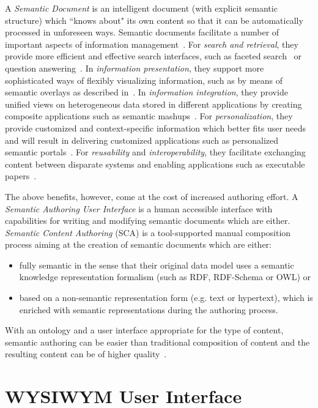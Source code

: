 \documentclass[journal]{IEEEtran}
\begin{document}
A \emph{Semantic Document} is an intelligent document (with explicit semantic structure) which ``knows about" its own content so that it can be automatically processed in unforeseen ways.
Semantic documents facilitate a number of important aspects of information management~\cite{rdface}.
For \emph{search and retrieval}, they provide more efficient and effective search interfaces, such as faceted search~\cite{tunkenlang2009faceted} or question answering~\cite{Lopez2011}.
In \emph{information presentation}, they support more sophisticated ways of flexibly visualizing information, such as by means of semantic overlays as described in~\cite{Burel2009}.
In \emph{information integration}, they provide unified views on heterogeneous data stored in different applications by creating composite applications such as semantic mashups~\cite{Ankolekar2007}.
For \emph{personalization}, they provide customized and context-specific information which better fits user needs and will
result in delivering customized applications such as personalized semantic portals~\cite{ecs2007}.
For \emph{reusability} and \emph{interoperability}, they facilitate exchanging content between disparate systems and enabling applications such as executable papers~\cite{Muller2011}.


The above benefits, however, come at the cost of increased authoring effort. %
A \emph{Semantic Authoring User Interface} is a human accessible interface with capabilities for writing and modifying semantic documents which are either.
\emph{Semantic Content Authoring} (SCA) is a tool-supported manual composition process aiming at the creation of semantic documents which are either:
\begin{itemize}
	\item fully semantic in the sense that their original data model uses a semantic knowledge representation formalism (such as RDF, RDF-Schema or OWL) or
	\item based on a non-semantic representation form (e.g. text or hypertext), which is enriched with semantic representations during the authoring process.\\
\end{itemize}

With an ontology and a user interface appropriate for the type of content, semantic authoring can be easier than traditional composition of content and the resulting content can be of higher quality~\cite{hasida2007}.


\section{WYSIWYM User Interface}
\label{sec:wysiwym}
\end{document}
